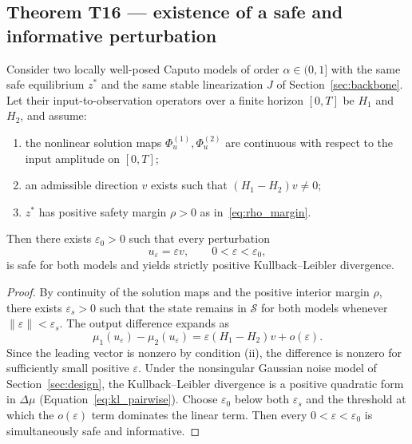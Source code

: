 \subsection{Theorem T16 --- existence of a safe and informative perturbation}

\begin{theorem}
\label{thm:T16}
Consider two locally well-posed Caputo models of order \(\alpha \in (0, 1]\) with the same safe equilibrium \(z^*\) and the same stable linearization \(J\) of Section~\ref{sec:backbone}. Let their input-to-observation operators over a finite horizon \([0, T]\) be \(H_1\) and \(H_2\), and assume:
\begin{enumerate}
\item[(i)] the nonlinear solution maps \(\Phi_{u}^{(1)}, \Phi_{u}^{(2)}\) are continuous with respect to the input amplitude on \([0, T]\);
\item[(ii)] an admissible direction \(v\) exists such that \((H_1 - H_2)v \neq 0\);
\item[(iii)] \(z^*\) has positive safety margin \(\rho > 0\) as in~\eqref{eq:rho_margin}.
\end{enumerate}
Then there exists \(\varepsilon_0 > 0\) such that every perturbation
\begin{equation}
u_{\varepsilon} = \varepsilon v, \qquad 0 < \varepsilon < \varepsilon_0,
\label{eq:scaled_pert}
\end{equation}
is safe for both models and yields strictly positive Kullback--Leibler divergence.
\end{theorem}

\begin{proof}
By continuity of the solution maps and the positive interior margin \(\rho\), there exists \(\varepsilon_s > 0\) such that the state remains in \(\mathcal{S}\) for both models whenever \(\|\varepsilon\| < \varepsilon_s\). The output difference expands as
\begin{equation}
\mu_1(u_{\varepsilon}) - \mu_2(u_{\varepsilon})
= \varepsilon (H_1 - H_2) v + o(\varepsilon).
\label{eq:output_expansion}
\end{equation}
Since the leading vector is nonzero by condition (ii), the difference is nonzero for sufficiently small positive \(\varepsilon\). Under the nonsingular Gaussian noise model of Section~\ref{sec:design}, the Kullback--Leibler divergence is a positive quadratic form in \(\Delta \mu\) (Equation~\ref{eq:kl_pairwise}). Choose \(\varepsilon_0\) below both \(\varepsilon_s\) and the threshold at which the \(o(\varepsilon)\) term dominates the linear term. Then every \(0 < \varepsilon < \varepsilon_0\) is simultaneously safe and informative.
\end{proof}

